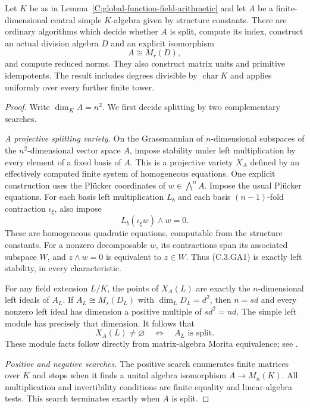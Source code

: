 \begin{theorem}
\label{C:global-function-central-simple-algorithms}
Let $K$ be as in
Lemma~\ref{C:global-function-field-arithmetic} and let $A$
be a finite-dimensional central simple $K$-algebra given by
structure constants. There are ordinary algorithms which
decide whether $A$ is split, compute its index, construct
an actual division algebra $D$ and an explicit isomorphism
\[
                         A\cong M_r(D),
\]
and compute reduced norms. They also construct matrix units
and primitive idempotents. The result includes degrees
divisible by $\operatorname{char}K$ and applies uniformly
over every further finite tower.
\end{theorem}
\begin{proof}
Write $\dim_K A=n^2$. We first decide splitting by two
complementary searches.

\emph{A projective splitting variety.}
On the Grassmannian of $n$-dimensional subspaces of the
$n^2$-dimensional vector space $A$, impose stability under
left multiplication by every element of a fixed basis of
$A$. This is a projective variety $X_A$ defined by an
effectively computed finite system of homogeneous equations.
One explicit construction uses the Pl\"ucker coordinates of
$w\in\bigwedge^n A$. Impose the usual Pl\"ucker equations.
For each basis left multiplication $L_b$ and each basis
$(n-1)$-fold contraction $\iota_\xi$, also impose
\[
                     L_b(\iota_\xi w)\wedge w=0.       \tag{C.3.GA1}
\]
These are homogeneous quadratic equations, computable from
the structure constants. For a nonzero decomposable $w$,
its contractions span its associated subspace $W$, and
$z\wedge w=0$ is equivalent to $z\in W$. Thus (C.3.GA1)
is exactly left stability, in every characteristic.

For any field extension $L/K$, the points of $X_A(L)$
are exactly the $n$-dimensional left ideals of $A_L$.
If $A_L\cong M_s(D_L)$ with
$\dim_LD_L=d^2$, then $n=sd$ and every nonzero left ideal
has dimension a positive multiple of $sd^2=nd$.
The simple left module has precisely that dimension.
It follows that
\[
           X_A(L)\ne\varnothing
               \quad\Longleftrightarrow\quad A_L\text{ is split}.
                                                               \tag{C.3.GA2}
\]
These module facts follow directly from matrix-algebra
Morita equivalence; see
\cite[Lemma 11.4.6]{C-StacksGlobalFunctionArithmetic}.

\emph{Positive and negative searches.}
The positive search enumerates finite matrices over $K$
and stops when it finds a unital algebra isomorphism
$A\to M_n(K)$. All multiplication and invertibility
conditions are finite equality and linear-algebra tests.
This search terminates exactly when $A$ is split.


\end{proof}
